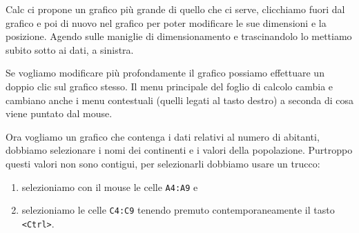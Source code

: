 \vspace{.5em}
Calc ci propone un grafico più grande di quello che ci serve, clicchiamo 
fuori dal grafico e poi di nuovo nel grafico per poter modificare le sue 
dimensioni e la posizione.
Agendo sulle maniglie di dimensionamento e trascinandolo lo mettiamo subito 
sotto ai dati, a sinistra.
\salvare

Se vogliamo modificare più profondamente il grafico possiamo
effettuare un doppio clic sul grafico stesso.
Il menu principale del foglio di calcolo cambia e cambiano anche i menu
contestuali (quelli legati al tasto destro) a seconda di cosa viene puntato
dal mouse.
% 

\salvare

Ora vogliamo un grafico che contenga i dati relativi al numero di
abitanti, dobbiamo selezionare i nomi dei continenti e i valori della
popolazione.
Purtroppo questi valori non sono contigui, per selezionarli
dobbiamo usare un trucco:

\begin{enumerate} [nosep]
\item selezioniamo con il mouse le celle \texttt{A4:A9} e
\item selezioniamo le celle \texttt{C4:C9} tenendo premuto contemporaneamente
il tasto \texttt{\textless{}Ctrl\textgreater{}}.
\end{enumerate}

